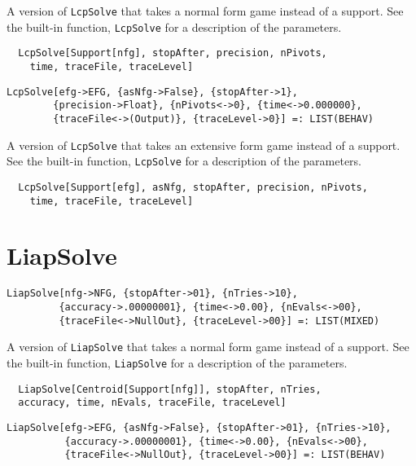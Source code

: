 \noindent
A version of \verb+LcpSolve+ that takes a normal form
game instead of a support.  See the built-in function,
\verb+LcpSolve+ for a description of the parameters.

\udfbody
\begin{verbatim}
  LcpSolve[Support[nfg], stopAfter, precision, nPivots,
    time, traceFile, traceLevel]
\end{verbatim} 

\newsignature

\begin{verbatim}
LcpSolve[efg->EFG, {asNfg->False}, {stopAfter->1}, 
        {precision->Float}, {nPivots<->0}, {time<->0.000000}, 
        {traceFile<->(Output)}, {traceLevel->0}] =: LIST(BEHAV) 
\end{verbatim}

\noindent
A version of \verb+LcpSolve+ that takes an extensive form
game instead of a support.  See the built-in function,
\verb+LcpSolve+ for a description of the parameters.

\udfbody
\begin{verbatim}
  LcpSolve[Support[efg], asNfg, stopAfter, precision, nPivots,
    time, traceFile, traceLevel]
\end{verbatim} 


\section*{LiapSolve}\label{ExtLiapSolve}
\begin{verbatim}
LiapSolve[nfg->NFG, {stopAfter->01}, {nTries->10}, 
         {accuracy->.00000001}, {time<->0.00}, {nEvals<->00}, 
         {traceFile<->NullOut}, {traceLevel->00}] =: LIST(MIXED)
\end{verbatim}

\noindent
A version of \verb+LiapSolve+ that takes a normal form
game instead of a support.  See the built-in function,
\verb+LiapSolve+ for a description of the parameters.

\udfbody
\begin{verbatim}
  LiapSolve[Centroid[Support[nfg]], stopAfter, nTries,
  accuracy, time, nEvals, traceFile, traceLevel]
\end{verbatim} 

\newsignature

\begin{verbatim}
LiapSolve[efg->EFG, {asNfg->False}, {stopAfter->01}, {nTries->10}, 
          {accuracy->.00000001}, {time<->0.00}, {nEvals<->00}, 
          {traceFile<->NullOut}, {traceLevel->00}] =: LIST(BEHAV)
\end{verbatim}

